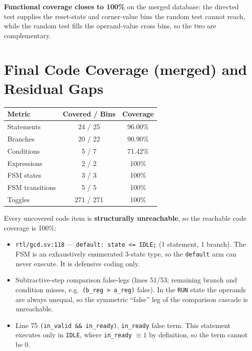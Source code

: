 \documentclass[11pt,a4paper]{article}
\begin{document}
\noindent\textbf{Functional coverage closes to 100\%} on the merged database: the
directed test supplies the reset-state and corner-value bins the random test
cannot reach, while the random test fills the operand-value cross bins, so the two
are complementary.

\section{Final Code Coverage (merged) and Residual Gaps}

\begin{table}[H]
\centering
\small
\begin{tabular}{lcc}
\toprule
\textbf{Metric} & \textbf{Covered / Bins} & \textbf{Coverage} \\
\midrule
Statements        & 24 / 25   & 96.00\%  \\
Branches          & 20 / 22   & 90.90\%  \\
Conditions        & 5 / 7     & 71.42\%  \\
Expressions       & 2 / 2     & 100\%    \\
FSM states        & 3 / 3     & 100\%    \\
FSM transitions   & 5 / 5     & 100\%    \\
Toggles           & 271 / 271 & 100\%    \\
\bottomrule
\end{tabular}
\end{table}

Every uncovered code item is \textbf{structurally unreachable}, so the reachable
code coverage is 100\%:

\begin{itemize}
  \item \texttt{rtl/gcd.sv:118} --- \texttt{default: state <= IDLE;} (1 statement,
        1 branch). The FSM is an exhaustively enumerated 3-state type, so the
        \texttt{default} arm can never execute. It is defensive coding only.
  \item Subtractive-step comparison false-legs (lines 51/53; remaining branch and
        condition misses, e.g.\ \texttt{(b\_reg > a\_reg)} false). In the
        \texttt{RUN} state the operands are always unequal, so the symmetric
        ``false'' leg of the comparison cascade is unreachable.
  \item Line 75 \texttt{(in\_valid \&\& in\_ready)}, \texttt{in\_ready} false term.
        This statement executes only in \texttt{IDLE}, where
        \texttt{in\_ready} $\equiv 1$ by definition, so the term cannot be 0.
\end{itemize}
\end{document}
